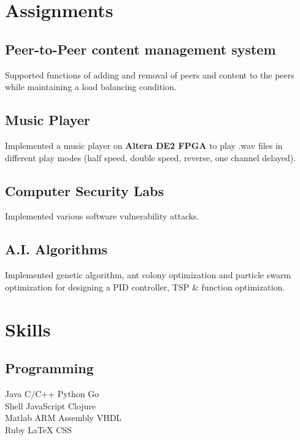 \documentclass[]{deedy-resume-openfont}
\begin{document}
\begin{minipage}[t]{0.31\textwidth}
\section{Assignments}
\subsection{Peer-to-Peer content management system}
Supported functions of adding and removal of peers and content to the peers while maintaining a load balancing condition.\\

\subsection{Music Player}
Implemented a music player on \textcolor{boldcolor}{\textbf{Altera DE2 FPGA}} to play .wav files in different play modes (half speed, double speed, reverse, one channel delayed).\\

\subsection{Computer Security Labs}
Implemented various software vulnerability attacks.

\subsection{A.I. Algorithms}
Implemented genetic algorithm, ant colony optimization and particle swarm optimization for designing a PID controller, TSP \& function optimization.
\sectionsep


\section{Skills}
\subsection{Programming}
Java \textbullet{} C/C++ \textbullet{} Python \textbullet{} Go\\
Shell \textbullet{} JavaScript \textbullet{} Clojure\\
Matlab \textbullet{} ARM Assembly \textbullet{} VHDL\\
Ruby \textbullet{} \LaTeX \textbullet{} CSS
\sectionsep


\end{minipage}
\end{document}
